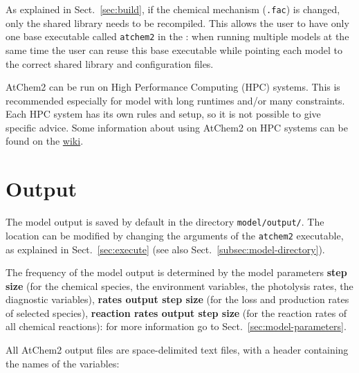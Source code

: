 As explained in Sect.~\ref{sec:build}, if the chemical mechanism (\texttt{.fac}) is
changed, only the shared library needs to be recompiled. This allows
the user to have only one base executable called \texttt{atchem2} in
the \maindir: when running multiple models at the same
time the user can reuse this base executable while pointing each model
to the correct shared library and configuration files.

AtChem2 can be run on High Performance Computing (HPC) systems. This
is recommended especially for model with long runtimes and/or many
constraints. Each HPC system has its own rules and setup, so it is not
possible to give specific advice. Some information about using AtChem2
on HPC systems can be found on the
\href{https://github.com/AtChem/AtChem2/wiki/Running-on-HPC}{wiki}.


\section{Output} \label{sec:output}

The model output is saved by default in the directory
\texttt{model/output/}. The location can be modified by changing the
arguments of the \texttt{atchem2} executable, as explained in
Sect.~\ref{sec:execute} (see also Sect.~\ref{subsec:model-directory}).

The frequency of the model output is determined by the model
parameters \textbf{step size} (for the chemical species, the
environment variables, the photolysis rates, the diagnostic
variables), \textbf{rates output step size} (for the loss and
production rates of selected species), \textbf{reaction rates output
  step size} (for the reaction rates of all chemical reactions): for
more information go to Sect.~\ref{sec:model-parameters}.

All AtChem2 output files are space-delimited text files, with a header
containing the names of the variables:


